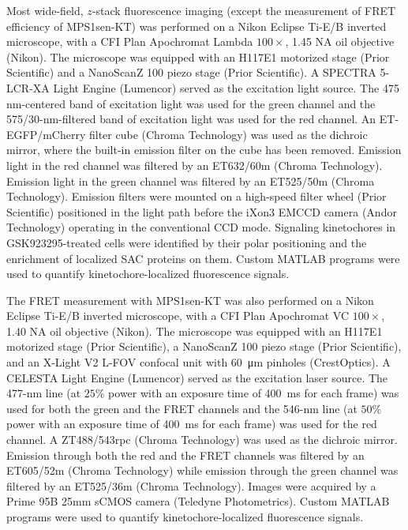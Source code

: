 Most wide-field, $z$-stack fluorescence imaging (except the measurement of FRET efficiency of MPS1sen-KT) was performed on a Nikon Eclipse Ti-E/B inverted microscope, with a CFI Plan Apochromat Lambda $100\times$, 1.45 NA oil objective (Nikon). The microscope was equipped with an H117E1 motorized stage (Prior Scientific) and a NanoScanZ 100 piezo stage (Prior Scientific). A SPECTRA 5-LCR-XA Light Engine (Lumencor) served as the excitation light source. The 475 nm-centered band of excitation light was used for the green channel and the 575/30-nm-filtered band of excitation light was used for the red channel. An ET-EGFP/mCherry filter cube (Chroma Technology) was used as the dichroic mirror, where the built-in emission filter on the cube has been removed. Emission light in the red channel was filtered by an ET632/60m (Chroma Technology). Emission light in the green channel was filtered by an ET525/50m (Chroma Technology). Emission filters were mounted on a high-speed filter wheel (Prior Scientific) positioned in the light path before the iXon3 EMCCD camera (Andor Technology) operating in the conventional CCD mode. Signaling kinetochores in GSK923295-treated cells were identified by their polar positioning and the enrichment of localized SAC proteins on them. Custom MATLAB programs \cite{HeLaFRETGUI} were used to quantify kinetochore-localized fluorescence signals.

The FRET measurement with MPS1sen-KT was also performed on a Nikon Eclipse Ti-E/B inverted microscope, with a CFI Plan Apochromat VC $100\times$, 1.40 NA oil objective (Nikon). The microscope was equipped with an H117E1 motorized stage (Prior Scientific), a NanoScanZ 100 piezo stage (Prior Scientific), and an X-Light V2 L-FOV confocal unit with \SI{60}{\micro m} pinholes (CrestOptics). A CELESTA Light Engine (Lumencor) served as the excitation laser source. The 477-nm line (at $25\%$ power with an exposure time of \SI{400}{ms} for each frame) was used for both the green and the FRET channels and the 546-nm line (at $50\%$ power with an exposure time of \SI{400}{ms} for each frame) was used for the red channel. A ZT488/543rpc (Chroma Technology) was used as the dichroic mirror. Emission through both the red and the FRET channels was filtered by an ET605/52m (Chroma Technology) while emission through the green channel was filtered by an ET525/36m (Chroma Technology). Images were acquired by a Prime 95B 25mm sCMOS camera (Teledyne Photometrics). Custom MATLAB programs \cite{HeLaFRETGUI} were used to quantify kinetochore-localized fluorescence signals.

